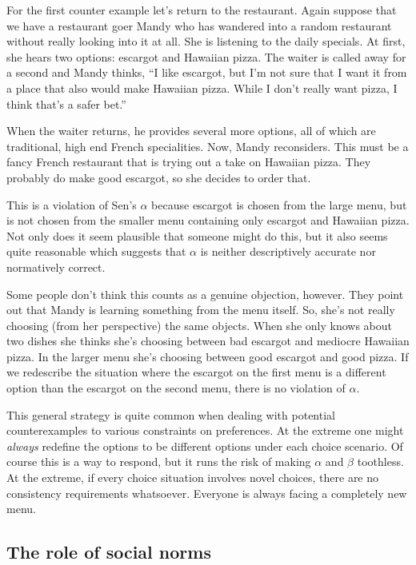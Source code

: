 For the first counter example let's return to the restaurant. Again suppose that we have a restaurant goer Mandy who has wandered into a random restaurant without really looking into it at all.  She is listening to the daily specials.  At first, she hears two options: escargot and Hawaiian pizza.  The waiter is called away for a second and Mandy thinks, ``I like escargot, but I'm not sure that I want it from a place that also would make Hawaiian pizza. While I don't really want pizza, I think that's a safer bet.''

When the waiter returns, he provides several more options, all of which are traditional, high end French specialities.  Now, Mandy reconsiders. This must be a fancy French restaurant that is trying out a take on Hawaiian pizza. They probably do make good escargot, so she decides to order that.

This is a violation of Sen's $\alpha$ because escargot is chosen from the large menu, but is not chosen from the smaller menu containing only escargot and Hawaiian pizza. Not only does it seem plausible that someone might do this, but it also seems quite reasonable which suggests that $\alpha$ is neither descriptively accurate nor normatively correct.

Some people don't think this counts as a genuine objection, however. They point out that Mandy is learning something from the menu itself.  So, she's not really choosing (from her perspective) the same objects.  When she only knows about two dishes she thinks she's choosing between bad escargot and mediocre Hawaiian pizza.  In the larger menu she's choosing between good escargot and good pizza.  If we redescribe the situation where the escargot on the first menu is a different option than the escargot on the second menu, there is no violation of $\alpha$.

This general strategy is quite common when dealing with potential counterexamples to various constraints on preferences.  At the extreme one might {\it always} redefine the options to be different options under each choice scenario.  Of course this is a way to respond, but it runs the risk of making $\alpha$ and $\beta$ toothless.  At the extreme, if every choice situation involves novel choices, there are no consistency requirements whatsoever. Everyone is always facing a completely new menu.

\subsection{The role of social norms}

